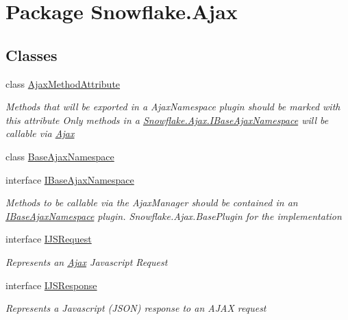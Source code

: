 \hypertarget{namespace_snowflake_1_1_ajax}{}\section{Package Snowflake.\+Ajax}
\label{namespace_snowflake_1_1_ajax}
\subsection*{Classes}
\begin{DoxyCompactItemize}
\item 
class \hyperlink{class_snowflake_1_1_ajax_1_1_ajax_method_attribute}{Ajax\+Method\+Attribute}
\begin{DoxyCompactList}\small\item\em Methods that will be exported in a Ajax\+Namespace plugin should be marked with this attribute Only methods in a \hyperlink{interface_snowflake_1_1_ajax_1_1_i_base_ajax_namespace}{Snowflake.\+Ajax.\+I\+Base\+Ajax\+Namespace} will be callable via \hyperlink{namespace_snowflake_1_1_ajax}{Ajax} \end{DoxyCompactList}\item 
class \hyperlink{class_snowflake_1_1_ajax_1_1_base_ajax_namespace}{Base\+Ajax\+Namespace}
\item 
interface \hyperlink{interface_snowflake_1_1_ajax_1_1_i_base_ajax_namespace}{I\+Base\+Ajax\+Namespace}
\begin{DoxyCompactList}\small\item\em Methods to be callable via the Ajax\+Manager should be contained in an \hyperlink{interface_snowflake_1_1_ajax_1_1_i_base_ajax_namespace}{I\+Base\+Ajax\+Namespace} plugin. Snowflake.\+Ajax.\+Base\+Plugin for the implementation \end{DoxyCompactList}\item 
interface \hyperlink{interface_snowflake_1_1_ajax_1_1_i_j_s_request}{I\+J\+S\+Request}
\begin{DoxyCompactList}\small\item\em Represents an \hyperlink{namespace_snowflake_1_1_ajax}{Ajax} Javascript Request \end{DoxyCompactList}\item 
interface \hyperlink{interface_snowflake_1_1_ajax_1_1_i_j_s_response}{I\+J\+S\+Response}
\begin{DoxyCompactList}\small\item\em Represents a Javascript (J\+S\+O\+N) response to an A\+J\+A\+X request \end{DoxyCompactList}\end{DoxyCompactItemize}
